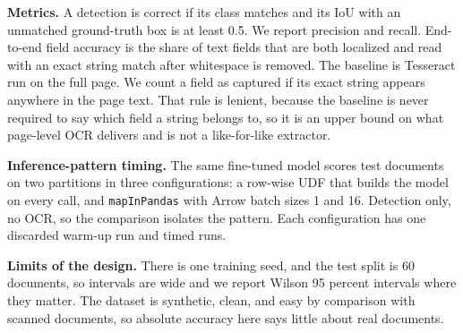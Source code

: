 \textbf{Metrics.} A detection is correct if its class matches and its IoU with an unmatched ground-truth box is at least 0.5. We report precision and recall. End-to-end field accuracy is the share of text fields that are both localized and read with an exact string match after whitespace is removed. The baseline is Tesseract run on the full page. We count a field as captured if its exact string appears anywhere in the page text. That rule is lenient, because the baseline is never required to say which field a string belongs to, so it is an upper bound on what page-level OCR delivers and is not a like-for-like extractor.

\textbf{Inference-pattern timing.} The same fine-tuned model scores \valPatDocs{} test documents on two partitions in three configurations: a row-wise UDF that builds the model on every call, and \texttt{mapInPandas} with Arrow batch sizes 1 and 16. Detection only, no OCR, so the comparison isolates the pattern. Each configuration has one discarded warm-up run and \valPatRepeats{} timed runs.

\textbf{Limits of the design.} There is one training seed, and the test split is 60 documents, so intervals are wide and we report Wilson 95 percent intervals where they matter. The dataset is synthetic, clean, and easy by comparison with scanned documents, so absolute accuracy here says little about real documents.
